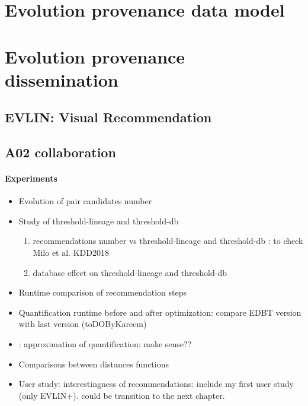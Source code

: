   \section{Evolution provenance data model}
  \section{Evolution provenance dissemination}
        		\subsection{EVLIN: Visual Recommendation}
		\subsection{A02 collaboration}









\paragraph*{Experiments}
\begin{itemize}
\item Evolution of pair candidates number
\item {\color{red}Study of threshold-lineage and threshold-db}
        \begin{enumerate}
             \item recommendations number vs threshold-lineage and threshold-db : to check Milo et al. KDD2018
             \item database effect on threshold-lineage and threshold-db
        \end{enumerate}
\item Runtime comparison of recommendation steps
\item {\color{red}Quantification runtime before and after optimization}: compare EDBT version with last version (toDOByKareem)
\item: approximation of quantification: make sense??
\item Comparisons between distances functions
\item  {\color{red}User study: interestingness of recommendations}: include my first user study (only EVLIN+). could be transition to the next chapter.
\end{itemize}
